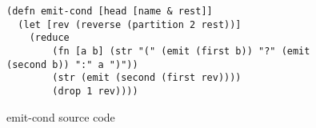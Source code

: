 \begin{figure}[ht]
\begin{verbatim}
(defn emit-cond [head [name & rest]]
  (let [rev (reverse (partition 2 rest))]
    (reduce
    	(fn [a b] (str "(" (emit (first b)) "?" (emit (second b)) ":" a ")"))
        (str (emit (second (first rev))))
        (drop 1 rev))))
\end{verbatim}
\caption{emit-cond source code}
\label{fig:emit-cond-code}
\end{figure}
